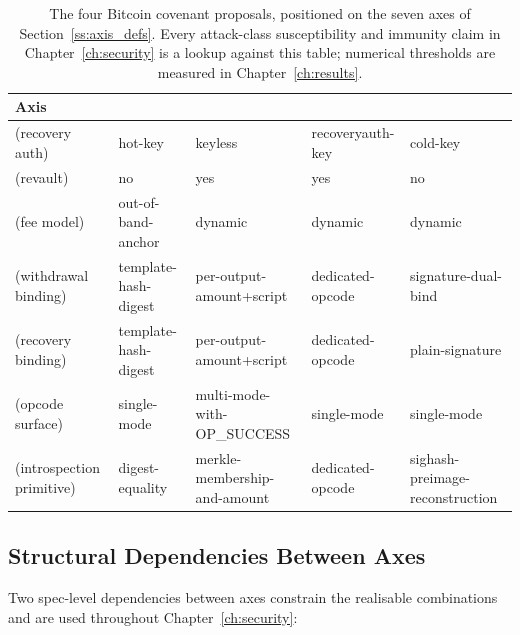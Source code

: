 \begin{table}[t]
\centering
\caption{The four Bitcoin covenant proposals, positioned on
the seven axes of Section~\ref{ss:axis_defs}. Every attack-class
susceptibility and immunity claim in Chapter~\ref{ch:security} is a
lookup against this table; numerical thresholds are measured in
Chapter~\ref{ch:results}.}
\label{tab:design_space_position}
\footnotesize
\setlength{\tabcolsep}{2.2pt}
\renewcommand{\arraystretch}{1.12}
\begin{tabular}{@{}lllll@{}}
\toprule
Axis                                    & \opctv{}               & \opccv{}                     & \opvault{}           & \catcsfs{}                      \\
\midrule
\axauth{} (recovery auth)               & hot-key                & keyless                      & recoveryauth-key     & cold-key                        \\
\axrevault{} (revault)                  & no                     & yes                          & yes                  & no                              \\
\axfee{} (fee model)                    & out-of-band-anchor     & dynamic                      & dynamic              & dynamic                         \\
\axwdbind{} (withdrawal binding)        & template-hash-digest   & per-output-amount+script     & dedicated-opcode     & signature-dual-bind             \\
\axrecbind{} (recovery binding)         & template-hash-digest   & per-output-amount+script     & dedicated-opcode     & plain-signature                 \\
\axopsurf{} (opcode surface)            & single-mode            & multi-mode-with-OP\_SUCCESS  & single-mode          & single-mode                     \\
\axintro{} (introspection primitive)    & digest-equality        & merkle-membership-and-amount & dedicated-opcode     & sighash-preimage-reconstruction \\
\bottomrule
\end{tabular}
\end{table}

\subsection{Structural Dependencies Between Axes}
\label{ss:axis_deps}

Two spec-level dependencies between axes constrain the realisable
combinations and are used throughout Chapter~\ref{ch:security}:


